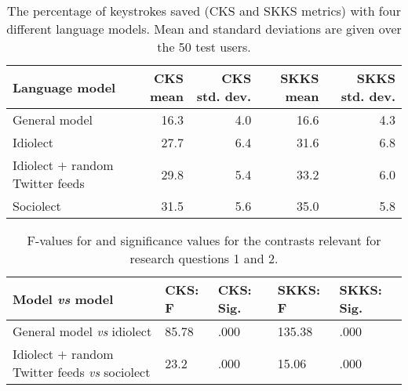 \documentclass[11pt]{article}
\begin{document}
\begin{table*}[htb]
\begin{center}
\begin{tabular}{l|rr|rr}
Language model&CKS mean&CKS std. dev.&SKKS mean&SKKS std. dev.\\
\hline
General model & 16.3 & 4.0 & 16.6 & 4.3 \\
Idiolect & 27.7 & 6.4 & 31.6 & 6.8 \\
Idiolect $+$ random Twitter feeds & 29.8 & 5.4 & 33.2 & 6.0 \\
Sociolect & 31.5 & 5.6 & 35.0 & 5.8 \\
\end{tabular}
\caption{The percentage of keystrokes saved (CKS and SKKS metrics) with four different language models. Mean and standard deviations are given over the 50 test users.}
\label{results}
\end{center}
\end{table*}


\begin{table*}[t]
\begin{tabular}{l|ll|ll}
Model \emph{vs} model &CKS: F&CKS: Sig.&SKKS: F&SKKS: Sig.\\
\hline
General model \emph{vs} idiolect & 85.78 & .000 & 135.38 & .000 \\
Idiolect $+$ random Twitter feeds \emph{vs} sociolect & 23.2 & .000 & 15.06 & .000\\
\end{tabular}
\caption{F-values for and significance values for the contrasts relevant for research questions 1 and 2.}
\label{stat}
\end{table*}
\end{document}
